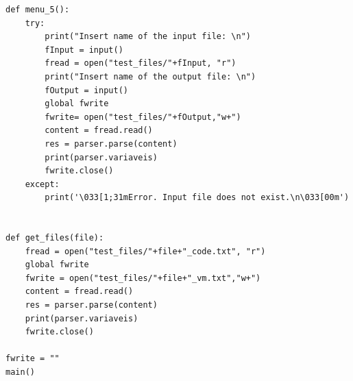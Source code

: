\documentclass[11pt,a4paper]{report}
\begin{document}
\begin{verbatim}
def menu_5():
    try:
        print("Insert name of the input file: \n")
        fInput = input()
        fread = open("test_files/"+fInput, "r")
        print("Insert name of the output file: \n")
        fOutput = input()
        global fwrite 
        fwrite= open("test_files/"+fOutput,"w+")
        content = fread.read()
        res = parser.parse(content)
        print(parser.variaveis)
        fwrite.close()
    except:
        print('\033[1;31mError. Input file does not exist.\n\033[00m')
    

def get_files(file):
    fread = open("test_files/"+file+"_code.txt", "r")
    global fwrite 
    fwrite = open("test_files/"+file+"_vm.txt","w+")
    content = fread.read()
    res = parser.parse(content)
    print(parser.variaveis)
    fwrite.close()

fwrite = ""
main()
\end{verbatim}
\end{document}
